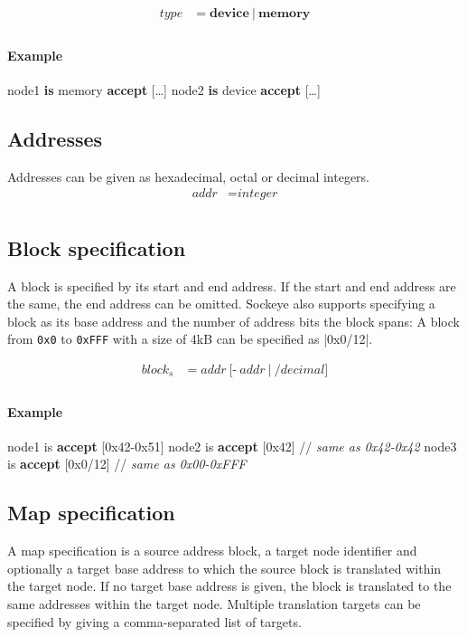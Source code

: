 \documentclass[a4paper,11pt,twoside]{report}
\begin{document}
{{{\begin{align*}
\textit{type} & \mathop{=}
	\textbf{device}\
	|\
	\textbf{memory} \\
\end{align*}

\paragraph{Example}
\begin{syntax}
	node1 \textbf{is} memory \textbf{accept} [\ldots]
	node2 \textbf{is} device \textbf{accept} [\ldots]
\end{syntax}

\subsection{Addresses}
Addresses can be given as hexadecimal, octal or decimal integers.
\begin{align*}
\textit{addr} & \mathop{=} \textit{integer} \\
\end{align*}

\clearpage
\subsection{Block specification}
A block is specified by its start and end address.
If the start and end address are the same, the end address can be omitted.
Sockeye also supports specifying a block as its base address and the number of address bits the block spans:
A block from \texttt{0x0} to \texttt{0xFFF} with a size of 4kB can be specified as \Sockeye|0x0/12|.

\begin{align*}
\textit{block}_s & \mathop{=} \textit{addr}\
	\Big[
		\textbf{-}\ \textit{addr}\ 
	\Big|\
		\textbf{/}decimal
	\Big] \\
\end{align*}

\paragraph{Example}
\begin{syntax}
	node1 is \textbf{accept} [0x42-0x51]
	node2 is \textbf{accept} [0x42]      // \textit{same as \textup{0x42-0x42}}
	node3 is \textbf{accept} [0x0/12]    // \textit{same as \textup{0x00-0xFFF}}
\end{syntax}

\subsection{Map specification}
A map specification is a source address block, a target node identifier and optionally a target base address to which the source block is translated within the target node.
If no target base address is given, the block is translated to the same addresses within the target node.
Multiple translation targets can be specified by giving a comma-separated list of targets.

}}}
\end{document}
